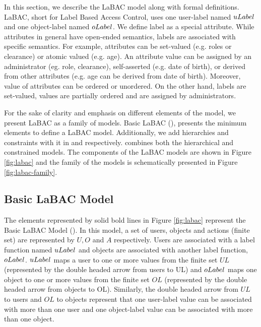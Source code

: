 \label{sec:model}


In this section, we describe the LaBAC model  along with formal definitions. LaBAC, short for Label Based Access Control, uses one user-label named $uLabel$ and one object-label named $oLabel$. We define label as a special attribute. While attributes in general have open-ended semantics, labels are associated with specific semantics. For example, attributes can be set-valued (e.g. roles or clearance) or atomic valued (e.g. age). An attribute value can be assigned by an administrator (eg. role, clearance), self-asserted (e.g. date of birth), or derived from other attributes (e.g. age can be derived from date of birth). Moreover, value of attributes can be ordered or unordered.  On the other hand, labels are set-valued, values are partially ordered and are assigned by administrators. 



For the sake of clarity and emphasis on different elements of the model, we present LaBAC as a family of models. Basic LaBAC (\clabac), presents the minimum elements to define a LaBAC model. Additionally, we add hierarchies and constraints with it in \hlabac{} and  \consLabac{} respectively.  \labacOneOneOne{} combines both the hierarchical and constrained models. The components of the LaBAC models are shown in Figure \ref{fig:labac} and the family of the models is schematically presented in Figure \ref{fig:labac-family}.
	
	
\subsection{Basic LaBAC Model}
The elements represented by solid bold lines in Figure \ref{fig:labac} represent the Basic LaBAC Model (\clabac{}). In this model, a set of users, objects and actions (finite set) are represented by $U, O$ and $A$ respectively. Users are associated with a label function named $uLabel$ and objects are associated with another label function, $oLabel$. $uLabel$ maps a user to one or more values from the finite set  $UL$ (represented by the double headed arrow from users to UL) and $oLabel$ maps one object to one or more values from the finite set $OL$ (represented by the double headed arrow from objects to OL). Similarly, the double headed arrow from $UL$  to users and $OL$ to objects represent that one user-label value can be associated with more than one user and one object-label value can be associated with more than one object. 




